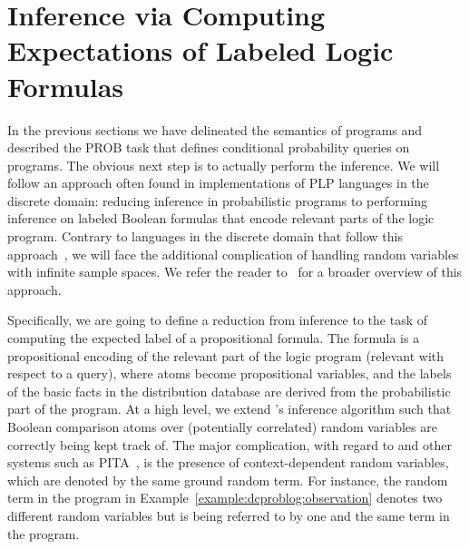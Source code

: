 \section{Inference via Computing Expectations of Labeled Logic Formulas} \label{sec:dc2smt}

In the previous sections we have delineated the semantics of \dcproblogsty programs and described the PROB task that defines conditional probability queries on \dcproblogsty programs. The obvious next step is to actually perform the inference. We will follow an approach often found in implementations of PLP languages in the discrete domain: reducing inference in probabilistic programs to 
performing inference on labeled Boolean formulas that encode relevant parts of the logic program.
Contrary to languages in the discrete domain that follow this approach~\citep{fierens2015inference,riguzzi2011pita}, we will face the additional complication of handling random variables with infinite sample spaces. We refer the reader to~\citep[Section 5]{riguzzi2018foundations} for a broader overview of this approach.

Specifically, we are going to define a reduction from \dcproblogsty inference to the task of computing the expected label of a propositional formula. The formula is a propositional encoding of the  relevant part of the logic program (relevant with respect to a query), where atoms become propositional variables, and the labels of the basic facts in the distribution database are derived from the probabilistic part of the program.
At a high level, we extend \problogsty's inference algorithm such that Boolean comparison atoms over (potentially correlated) random variables are correctly being kept track of. The major complication, with regard to \problogsty and other systems such as PITA~\citep{riguzzi2011pita}, is the presence of context-dependent random variables, which are denoted by the same ground random term. For instance, the random term  in the program in Example~\ref{example:dcproblog:observation} denotes two different random variables but is being referred to by one and the same term in the program.

